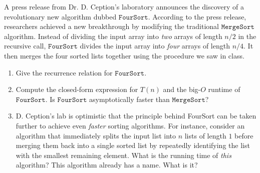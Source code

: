 \documentclass[12 pt, letterpaper]{hmcpset}
\begin{document}
\begin{problem}
	A press release from Dr. D. Ception's laboratory announces the discovery of a revolutionary new algorithm dubbed $\mathtt{FourSort}$. According to the press release, researchers achieved a new breakthrough by modifying the traditional $\mathtt{MergeSort}$ algorithm. Instead of dividing the input array into \emph{two} arrays of length $n / 2$ in the recursive call, $\mathtt{FourSort}$ divides the input array into \emph{four} arrays of length $n / 4$. It then merges the four sorted lists together using the procedure we saw in class.
	\begin{enumerate}
		\item Give the recurrence relation for $\mathtt{FourSort}$.

		\item Compute the closed-form expression for $T(n)$ and the big-$O$ runtime of $\mathtt{FourSort}$. Is $\mathtt{FourSort}$ asymptotically faster than $\mathtt{MergeSort}$?

		\item D. Ception's lab is optimistic that the principle behind FourSort can be taken further to achieve even \emph{faster} sorting algorithms. For instance, consider an algorithm that immediately splits the input list into $n$ lists of length $1$ before merging them back into a single sorted list by repeatedly identifying the list with the smallest remaining element. What is the running time of \emph{this} algorithm? This algorithm already has a name. What is it?
	\end{enumerate}
\end{problem}
\end{document}
